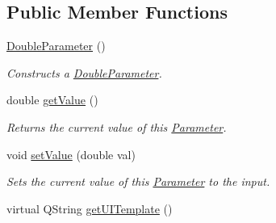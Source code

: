\subsection*{Public Member Functions}
\begin{DoxyCompactItemize}
\item 
\hyperlink{class_picto_1_1_double_parameter_a28d4cc0c39756c4bd6f2c326f881d844}{Double\-Parameter} ()
\begin{DoxyCompactList}\small\item\em Constructs a \hyperlink{class_picto_1_1_double_parameter}{Double\-Parameter}. \end{DoxyCompactList}\item 
\hypertarget{class_picto_1_1_double_parameter_afc23ed375e032fb62a229048cf3e4504}{double \hyperlink{class_picto_1_1_double_parameter_afc23ed375e032fb62a229048cf3e4504}{get\-Value} ()}\label{class_picto_1_1_double_parameter_afc23ed375e032fb62a229048cf3e4504}

\begin{DoxyCompactList}\small\item\em Returns the current value of this \hyperlink{class_picto_1_1_parameter}{Parameter}. \end{DoxyCompactList}\item 
\hypertarget{class_picto_1_1_double_parameter_a90503201f468995d8fbe2ed25487adf8}{void \hyperlink{class_picto_1_1_double_parameter_a90503201f468995d8fbe2ed25487adf8}{set\-Value} (double val)}\label{class_picto_1_1_double_parameter_a90503201f468995d8fbe2ed25487adf8}

\begin{DoxyCompactList}\small\item\em Sets the current value of this \hyperlink{class_picto_1_1_parameter}{Parameter} to the input. \end{DoxyCompactList}\item 
\hypertarget{class_picto_1_1_double_parameter_a7d3466cfd2a2d6bfafce9666471725d4}{virtual Q\-String \hyperlink{class_picto_1_1_double_parameter_a7d3466cfd2a2d6bfafce9666471725d4}{get\-U\-I\-Template} ()}\label{class_picto_1_1_double_parameter_a7d3466cfd2a2d6bfafce9666471725d4}


\end{DoxyCompactItemize}
